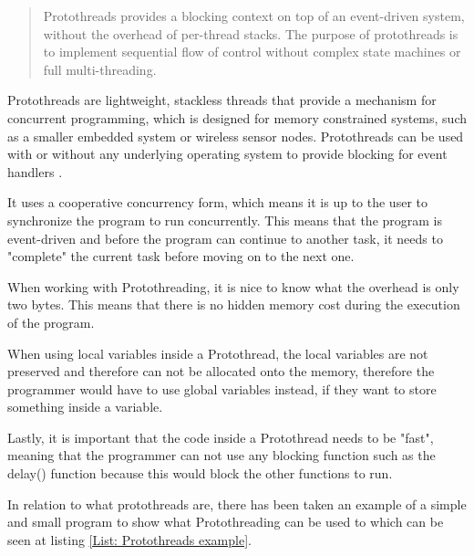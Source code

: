 \blockcquote{Artin2020}{Protothreads provides a blocking context on top of an event-driven system, without the overhead of per-thread stacks. The purpose of protothreads is to implement sequential flow of control without complex state machines or full multi-threading.}

Protothreads are lightweight, stackless threads that provide a mechanism for concurrent programming, which is designed for memory constrained systems, such as a smaller embedded system or wireless sensor nodes. Protothreads can be used with or without any underlying operating system to provide blocking for event handlers \cite{AdamDunkelProtothreads}.

It uses a cooperative concurrency form, which means it is up to the user to synchronize the program to run concurrently. This means that the program is event-driven and before the program can continue to another task, it needs to "complete" the current task before moving on to the next one.

When working with Protothreading, it is nice to know what the overhead is only two bytes. This means that there is no hidden memory cost during the execution of the program.

When using local variables inside a Protothread, the local variables are not preserved and therefore can not be allocated onto the memory, therefore the programmer would have to use global variables instead, if they want to store something inside a variable.

Lastly, it is important that the code inside a Protothread needs to be "fast", meaning that the programmer can not use any blocking function such as the delay() function because this would block the other functions to run. \cite{AdamDunkelProtothreads}

In relation to what protothreads are, there has been taken an example of a simple and small program to show what Protothreading can be used to which can be seen at listing \ref{List: Protothreads example}.


